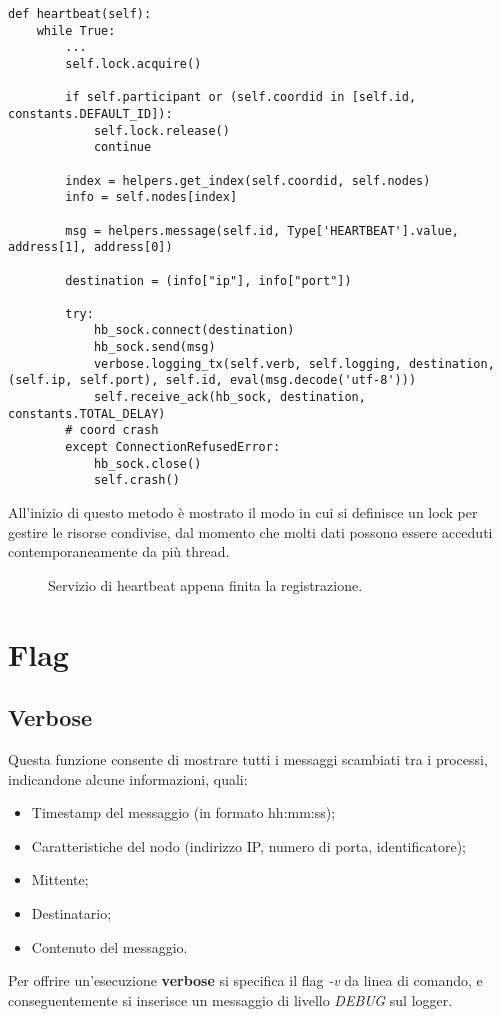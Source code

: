 \documentclass[conference]{IEEEtran}
\begin{document}
\begin{lstlisting}
def heartbeat(self):
    while True:
        ...
        self.lock.acquire()

        if self.participant or (self.coordid in [self.id, constants.DEFAULT_ID]):
            self.lock.release()
            continue

        index = helpers.get_index(self.coordid, self.nodes)
        info = self.nodes[index]

        msg = helpers.message(self.id, Type['HEARTBEAT'].value, address[1], address[0])

        destination = (info["ip"], info["port"])

        try:
            hb_sock.connect(destination)
            hb_sock.send(msg)
            verbose.logging_tx(self.verb, self.logging, destination, (self.ip, self.port), self.id, eval(msg.decode('utf-8')))
            self.receive_ack(hb_sock, destination, constants.TOTAL_DELAY)
        # coord crash
        except ConnectionRefusedError:
            hb_sock.close()
            self.crash()
\end{lstlisting}

All'inizio di questo metodo è mostrato il modo in cui si definisce un lock per gestire le risorse condivise, dal momento che molti dati possono essere acceduti contemporaneamente da più thread.

\begin{figure}[htbp]
  \centering
  
  \caption{Servizio di heartbeat appena finita la registrazione.}
\end{figure}


\section{Flag}\label{sec:flag}


\subsection{Verbose}\label{verbose}

Questa funzione consente di mostrare tutti i messaggi scambiati tra i processi, indicandone alcune informazioni, quali:
\begin{itemize}
	\item Timestamp del messaggio (in formato hh:mm:ss);
	\item Caratteristiche del nodo (indirizzo IP, numero di porta, identificatore);
	\item Mittente;
	\item Destinatario;
	\item Contenuto del messaggio.
\end{itemize}
Per offrire un'esecuzione \textbf{verbose} si specifica il flag \textit{-v} da linea di comando, e conseguentemente si inserisce un messaggio di livello \textit{DEBUG} sul logger.
\end{document}
